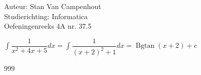 \documentclass[a4paper]{article}
\begin{document}
  
\noindent \large Auteur: Stan Van Campenhout \\
\noindent \large Studierichting:  Informatica\\
\noindent \large Oefeningenreeks 4A nr. 37.5\\

\medskip

\normalsize

$ \displaystyle\int\dfrac{1}{x^2+4x+5}dx = \displaystyle\int\dfrac{1}{\left(x+2\right)^2+1}dx = \operatorname{Bgtan}\left(x+2\right) + c $\\

\begin{thebibliography}{999}
\end{thebibliography}
\end{document}
